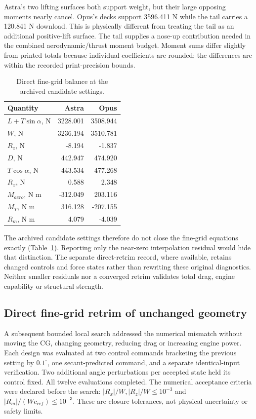 \documentclass[11pt,a4paper]{article}
\begin{document}
Astra's two lifting surfaces both support weight, but their large opposing moments nearly cancel. Opus's decks support 3596.411 N while the tail carries a 120.841 N download. This is physically different from treating the tail as an additional positive-lift surface. The tail supplies a nose-up contribution needed in the combined aerodynamic/thrust moment budget. Moment sums differ slightly from printed totals because individual coefficients are rounded; the differences are within the recorded print-precision bounds.

\begin{table}[H]\centering\small
\caption{Direct fine-grid balance at the archived candidate settings.}\label{tab:residual}
\begin{tabular}{lrr}\toprule
Quantity & Astra & Opus\\\midrule
$L+T\sin\alpha$, N &3228.001&3508.944\\
$W$, N &3236.194&3510.781\\
$R_z$, N &-8.194&-1.837\\
$D$, N &442.947&474.920\\
$T\cos\alpha$, N &443.534&477.268\\
$R_x$, N &0.588&2.348\\
$M_{aero}$, N m &-312.049&203.116\\
$M_T$, N m &316.128&-207.155\\
$R_m$, N m &4.079&-4.039\\\bottomrule
\end{tabular}
\end{table}

The archived candidate settings therefore do not close the fine-grid equations exactly (Table~\ref{tab:residual}). Reporting only the near-zero interpolation residual would hide that distinction. The separate direct-retrim record, where available, retains changed controls and force states rather than rewriting these original diagnostics. Neither smaller residuals nor a converged retrim validates total drag, engine capability or structural strength.

\subsection{Direct fine-grid retrim of unchanged geometry}
A subsequent bounded local search addressed the numerical mismatch without moving the CG, changing geometry, reducing drag or increasing engine power. Each design was evaluated at two control commands bracketing the previous setting by $0.1^\circ$, one secant-predicted command, and a separate identical-input verification. Two additional angle perturbations per accepted state held its control fixed. All twelve evaluations completed. The numerical acceptance criteria were declared before the search: $|R_x|/W,|R_z|/W\leq10^{-3}$ and $|R_m|/(Wc_{ref})\leq10^{-3}$. These are closure tolerances, not physical uncertainty or safety limits.
\end{document}
